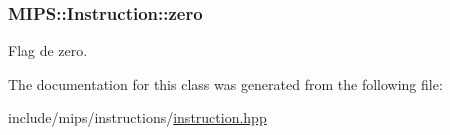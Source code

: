 \subsubsection[{\texorpdfstring{zero}{zero}}]{ M\+I\+P\+S\+::\+Instruction\+::zero\hspace{0.3cm}{\ttfamily [protected]}}\hypertarget{classMIPS_1_1Instruction_a78e2b55f80640b476e99ee54f5be068c}{}\label{classMIPS_1_1Instruction_a78e2b55f80640b476e99ee54f5be068c}
Flag de zero. 

The documentation for this class was generated from the following file\+:\begin{DoxyCompactItemize}
\item 
include/mips/instructions/\hyperlink{instruction_8hpp}{instruction.\+hpp}\end{DoxyCompactItemize}
